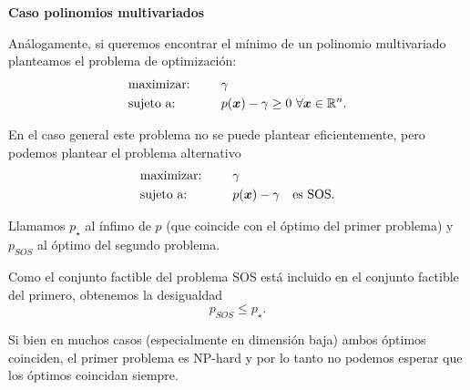\textbf{Caso polinomios multivariados}

Análogamente, si queremos encontrar el mínimo de un polinomio multivariado planteamos el problema de optimización:
\begin{alignat*}{2}
  & \text{maximizar: } & & \gamma  \\
  & \text{sujeto a: } & \quad & p(\xb) - \gamma \ge 0 \ \forall \xb \in \R^n.
\end{alignat*}

En el caso general este problema no se puede plantear eficientemente, pero podemos plantear el problema alternativo
\begin{alignat*}{2}
  & \text{maximizar: } & & \gamma  \\
  & \text{sujeto a: } & \quad & p(\bm{x}) - \gamma \quad \text{es SOS}.
\end{alignat*}

Llamamos $p_{\star}$ al ínfimo de $p$ (que coincide con el óptimo del primer problema) y $p_{SOS}$ al óptimo del segundo problema.

Como el conjunto factible del problema SOS está incluido en el conjunto factible del primero, obtenemos la desigualdad
$$
p_{SOS} \le p_{\star}.
$$

Si bien en muchos casos (especialmente en dimensión baja) ambos óptimos coinciden, el primer problema es NP-hard y por lo tanto no podemos esperar que los óptimos coincidan siempre.


